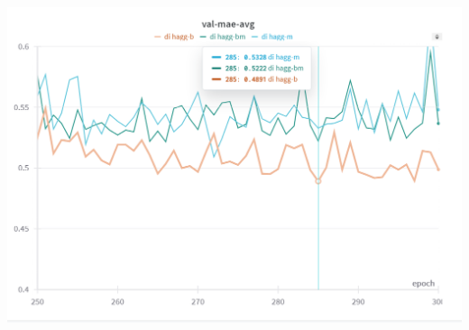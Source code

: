 \documentclass[10pt,a4paper]{article}
\begin{document}
\includegraphics[scale=0.84]{dielectric.png}
\end{document}

